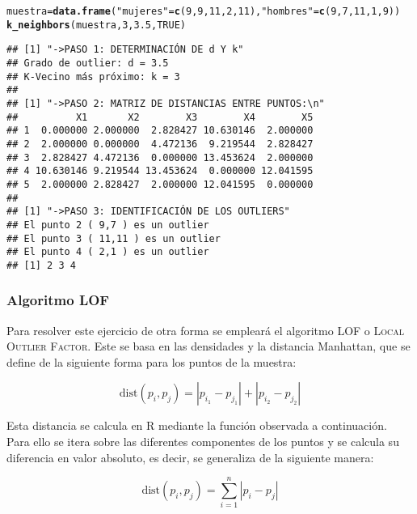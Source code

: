 \documentclass[12pt]{report}\usepackage[]{graphicx}\usepackage[dvipsnames]{xcolor}
\makeatletter
\newcommand{\hlnum}[1]{\textcolor[rgb]{0.686,0.059,0.569}{#1}}%
\newcommand{\hlstr}[1]{\textcolor[rgb]{0.192,0.494,0.8}{#1}}%
\newcommand{\hlstd}[1]{\textcolor[rgb]{0.345,0.345,0.345}{#1}}%
\newcommand{\hlkwb}[1]{\textcolor[rgb]{0.69,0.353,0.396}{#1}}%
\newcommand{\hlkwd}[1]{\textcolor[rgb]{0.737,0.353,0.396}{\textbf{#1}}}%
\newenvironment{kframe}{%
 \def\at@end@of@kframe{}%
 \ifinner\ifhmode%
  \def\at@end@of@kframe{\end{minipage}}%
  \begin{minipage}{\columnwidth}%
 \fi\fi%
 \def\FrameCommand##1{\hskip\@totalleftmargin \hskip-\fboxsep
 \colorbox{shadecolor}{##1}\hskip-\fboxsep
     \hskip-\linewidth \hskip-\@totalleftmargin \hskip\columnwidth}%
 \MakeFramed {\advance\hsize-\width
   \@totalleftmargin\z@ \linewidth\hsize
   \@setminipage}}%
 {\par\unskip\endMakeFramed%
 \at@end@of@kframe}
\newenvironment{knitrout}{}{} %
\newcommand{\dt}{\text{dist}}
\makeatother
\begin{document}
\begin{knitrout}
\color{fgcolor}\begin{kframe}
\begin{alltt}
\hlstd{muestra} \hlkwb{=} \hlkwd{data.frame}\hlstd{(}\hlstr{"mujeres"} \hlstd{=} \hlkwd{c}\hlstd{(}\hlnum{9}\hlstd{,}\hlnum{9}\hlstd{,}\hlnum{11}\hlstd{,}\hlnum{2}\hlstd{,}\hlnum{11}\hlstd{),} \hlstr{"hombres"} \hlstd{=} \hlkwd{c}\hlstd{(}\hlnum{9}\hlstd{,}\hlnum{7}\hlstd{,}\hlnum{11}\hlstd{,}\hlnum{1}\hlstd{,}\hlnum{9}\hlstd{))}
\hlkwd{k_neighbors}\hlstd{(muestra,}\hlnum{3}\hlstd{,}\hlnum{3.5}\hlstd{,}\hlnum{TRUE}\hlstd{)}
\end{alltt}
\begin{verbatim}
## [1] "->PASO 1: DETERMINACIÓN DE d Y k"
## Grado de outlier: d = 3.5 
## K-Vecino más próximo: k = 3 
## 
## [1] "->PASO 2: MATRIZ DE DISTANCIAS ENTRE PUNTOS:\n"
##          X1       X2        X3        X4        X5
## 1  0.000000 2.000000  2.828427 10.630146  2.000000
## 2  2.000000 0.000000  4.472136  9.219544  2.828427
## 3  2.828427 4.472136  0.000000 13.453624  2.000000
## 4 10.630146 9.219544 13.453624  0.000000 12.041595
## 5  2.000000 2.828427  2.000000 12.041595  0.000000
## 
## [1] "->PASO 3: IDENTIFICACIÓN DE LOS OUTLIERS"
## El punto 2 ( 9,7 ) es un outlier
## El punto 3 ( 11,11 ) es un outlier
## El punto 4 ( 2,1 ) es un outlier
## [1] 2 3 4
\end{verbatim}
\end{kframe}
\end{knitrout}
					
					\subsubsection{Algoritmo LOF}
					
						Para resolver este ejercicio de otra forma se empleará el algoritmo LOF o \textsc{Local Outlier Factor}. Este se basa en las densidades y la distancia Manhattan, que se define de la siguiente forma para los puntos de la muestra: 
						
						$$
						\dt(p_i, p_j) = |p_{i_1}-p_{j_1}| + |p_{i_2}-p_{j_2}|
						$$
						
						Esta distancia se calcula en R mediante la función observada a continuación. Para ello se itera sobre las diferentes componentes de los puntos y se calcula su diferencia en valor absoluto, es decir, se generaliza de la siguiente manera: 
						
						$$
						\dt(p_i, p_j) = \sum_{i=1}^n |p_i-p_j|
						$$
						
\end{document}
